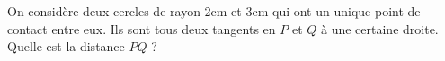 \begin{exo}
On considère deux cercles de rayon $2$cm et $3$cm qui ont un unique point de contact entre eux.
Ils sont tous deux tangents en $P$ et $Q$ à une certaine droite.
Quelle est la distance $PQ$ ?
\begin{center}
\end{center}
\begin{hint}
\end{hint}
\begin{sol}
\end{sol}
\end{exo}



